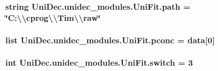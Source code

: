\subsubsection[{path}]{\setlength{\rightskip}{0pt plus 5cm}string Uni\+Dec.\+unidec\+\_\+modules.\+Uni\+Fit.\+path = \char`\"{}C\+:\textbackslash{}\textbackslash{}cprog\textbackslash{}\textbackslash{}\+Tim\textbackslash{}\textbackslash{}raw\char`\"{}}\label{namespace_uni_dec_1_1unidec__modules_1_1_uni_fit_a10fa2934eaf46e94fe06c0a27ffa4e23}
\hypertarget{namespace_uni_dec_1_1unidec__modules_1_1_uni_fit_aa019b40015da9a7ea7f34a51f432d066}{}
\subsubsection[{pconc}]{\setlength{\rightskip}{0pt plus 5cm}list Uni\+Dec.\+unidec\+\_\+modules.\+Uni\+Fit.\+pconc = {\bf data}\mbox{[}0\mbox{]}}\label{namespace_uni_dec_1_1unidec__modules_1_1_uni_fit_aa019b40015da9a7ea7f34a51f432d066}
\hypertarget{namespace_uni_dec_1_1unidec__modules_1_1_uni_fit_a9c7cbcf85c64797ae885ac605f163762}{}
\subsubsection[{switch}]{\setlength{\rightskip}{0pt plus 5cm}int Uni\+Dec.\+unidec\+\_\+modules.\+Uni\+Fit.\+switch = 3}\label{namespace_uni_dec_1_1unidec__modules_1_1_uni_fit_a9c7cbcf85c64797ae885ac605f163762}
